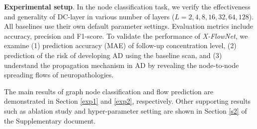 \documentclass{article}
\begin{document}
 \textbf{Experimental setup}. In the node classification task, we verify the effectiveness and generality of DC-layer in various number of layers ($L={2, 4, 8, 16, 32, 64, 128}$). All baselines use their own default parameter settings. Evaluation metrics include accuracy, precision and F1-score. To validate the performance of \textit{X-FlowNet}, we examine (1) prediction accuracy (MAE) of follow-up concentration level, (2) prediction of the risk of developing AD using the baseline scan, and (3) understand the propagation mechanism in AD by revealing the node-to-node spreading flows of neuropathologies.

The main results of graph node classification and flow prediction are demonstrated in Section \ref{exp1} and \ref{exp2}, respectively. Other supporting results such as ablation study and hyper-parameter setting are shown in Section \ref{s2} of the Supplementary document.
\end{document}
